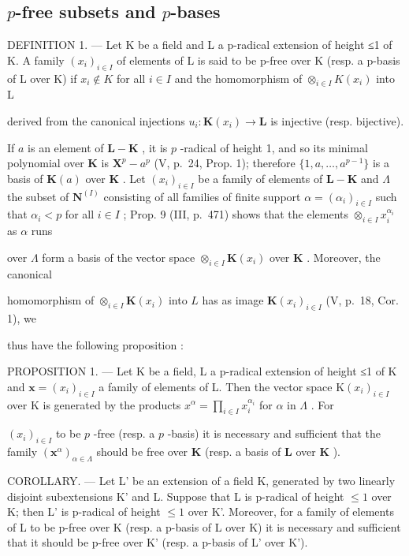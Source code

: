 \subsection{\texorpdfstring{\(p\)-free subsets and \(p\)-bases}{p-free subsets and p-bases}}

DEFINITION 1. --- Let K be a field and L a p-radical extension of height ≤1 of K. A family \((x_i)_{i \in I}\) of elements of L is said to be p-free over K (resp. a p-basis of L over K) if \(x_i \notin K\) for all \(i \in I\) and the homomorphism of \(\otimes_{i \in I} K(x_i)\) into L

derived from the canonical injections \(u_{i}:\mathbf{K}(x_{i})\to \mathbf{L}\) is injective (resp. bijective).

If \(a\) is an element of \(\mathbf{L} - \mathbf{K}\) , it is \(p\) -radical of height 1, and so its minimal polynomial over \(\mathbf{K}\) is \(\mathbf{X}^p - a^p\) (V, p.~24, Prop. 1); therefore \(\{1, a, \ldots, a^{p-1}\}\) is a basis of \(\mathbf{K}(a)\) over \(\mathbf{K}\) . Let \((x_i)_{i \in I}\) be a family of elements of \(\mathbf{L} - \mathbf{K}\) and \(\Lambda\) the subset of \(\mathbf{N}^{(I)}\) consisting of all families of finite support \(\alpha = (\alpha_i)_{i \in I}\) such that \(\alpha_i < p\) for all \(i \in I\) ; Prop. 9 (III, p.~471) shows that the elements \(\otimes_{i \in I} x_i^{\alpha_i}\) as \(\alpha\) runs

over \(\Lambda\) form a basis of the vector space \(\otimes_{i\in I}\mathbf{K}(x_i)\) over \(\mathbf{K}\) . Moreover, the canonical

homomorphism of \(\otimes_{i\in I}\mathbf{K}(x_i)\) into \(L\) has as image \(\mathbf{K}(x_i)_{i\in I}\) (V, p.~18, Cor. 1), we

thus have the following proposition :

PROPOSITION 1. --- Let K be a field, L a p-radical extension of height ≤1 of K and \(\mathbf{x} = (x_{i})_{i \in I}\) a family of elements of L. Then the vector space \(\mathrm{K}(x_{i})_{i \in I}\) over K is generated by the products \(x^{\alpha} = \prod_{i \in I} x_{i}^{\alpha_{i}}\) for \(\alpha\) in \(\Lambda\) . For

\((x_{i})_{i\in I}\) to be \(p\) -free (resp. a \(p\) -basis) it is necessary and sufficient that the family \((\mathbf{x}^{\alpha})_{\alpha \in \Lambda}\) should be free over \(\mathbf{K}\) (resp. a basis of \(\mathbf{L}\) over \(\mathbf{K}\) ).

COROLLARY. --- Let L' be an extension of a field K, generated by two linearly disjoint subextensions K' and L. Suppose that L is p-radical of height \(\leqslant 1\) over K; then L' is p-radical of height \(\leqslant 1\) over K'. Moreover, for a family of elements of L to be p-free over K (resp. a p-basis of L over K) it is necessary and sufficient that it should be p-free over K' (resp. a p-basis of L' over K').

